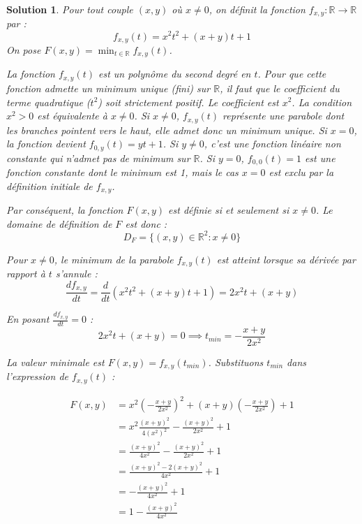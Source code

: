 \documentclass[10pt]{article}
\theoremstyle{frenchstyle}
\newtheorem{solution}{Solution}
\begin{document}
\begin{solution}
	
	Pour tout couple $(x, y)$ où $x \neq 0$, on définit la fonction $f_{x,y} : \mathbb{R} \to \mathbb{R}$ par :
    \[
        f_{x,y}(t) = x^2 t^2 + (x+y)t + 1
    \]
    On pose $F(x,y) = \min_{t \in \mathbb{R}} f_{x,y}(t)$.

    La fonction $f_{x,y}(t)$ est un polynôme du second degré en $t$. Pour que cette fonction admette un minimum unique (fini) sur $\mathbb{R}$, il faut que le coefficient du terme quadratique ($t^2$) soit strictement positif.
    Le coefficient est $x^2$. La condition $x^2 > 0$ est équivalente à $x \neq 0$.
    Si $x \neq 0$, $f_{x,y}(t)$ représente une parabole dont les branches pointent vers le haut, elle admet donc un minimum unique.
    Si $x = 0$, la fonction devient $f_{0,y}(t) = yt + 1$. Si $y \neq 0$, c'est une fonction linéaire non constante qui n'admet pas de minimum sur $\mathbb{R}$. Si $y = 0$, $f_{0,0}(t) = 1$ est une fonction constante dont le minimum est 1, mais le cas $x=0$ est exclu par la définition initiale de $f_{x,y}$.

    Par conséquent, la fonction $F(x,y)$ est définie si et seulement si $x \neq 0$.
    Le domaine de définition de $F$ est donc :
    \[
        D_F = \{(x, y) \in \mathbb{R}^2 : x \neq 0\}
    \]

    Pour $x \neq 0$, le minimum de la parabole $f_{x,y}(t)$ est atteint lorsque sa dérivée par rapport à $t$ s'annule :
    \[
        \frac{df_{x,y}}{dt} = \frac{d}{dt} (x^2 t^2 + (x+y)t + 1) = 2x^2 t + (x+y)
    \]

    En posant $\frac{df_{x,y}}{dt} = 0$ :
    \[
        2x^2 t + (x+y) = 0 \implies t_{min} = -\frac{x+y}{2x^2}
    \]

    La valeur minimale est $F(x,y) = f_{x,y}(t_{min})$. Substituons $t_{min}$ dans l'expression de $f_{x,y}(t)$ :
    
	\begin{align*}
        F(x,y) & = x^2 \left(-\frac{x+y}{2x^2}\right)^2 + (x+y)\left(-\frac{x+y}{2x^2}\right) + 1 \\
               & = x^2 \frac{(x+y)^2}{4(x^2)^2} - \frac{(x+y)^2}{2x^2} + 1 \\
               & = \frac{(x+y)^2}{4x^2} - \frac{(x+y)^2}{2x^2} + 1 \\
               & = \frac{(x+y)^2 - 2(x+y)^2}{4x^2} + 1 \\
               & = -\frac{(x+y)^2}{4x^2} + 1 \\
               & = 1 - \frac{(x+y)^2}{4x^2}
    \end{align*}


\end{solution}
\end{document}
